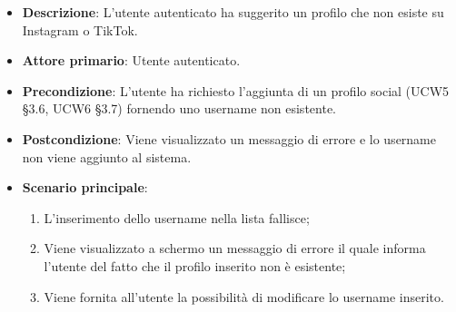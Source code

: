 \begin{itemize}
	\item \textbf{Descrizione}: L'utente autenticato ha suggerito un profilo che non esiste su Instagram o TikTok.
    \item \textbf{Attore primario}: Utente autenticato.
    \item \textbf{Precondizione}: L’utente ha richiesto l’aggiunta di un profilo social (UCW5 §3.6, UCW6 §3.7) fornendo uno username non esistente.
    \item \textbf{Postcondizione}: Viene visualizzato un messaggio di errore e lo username non viene aggiunto al sistema.
    \item \textbf{Scenario principale}: 
    \begin{enumerate}
        \item L'inserimento dello username nella lista fallisce;
        \item Viene visualizzato a schermo un messaggio di errore il quale informa l'utente del fatto che il profilo inserito non è esistente;
        \item Viene fornita all'utente la possibilità di modificare lo username inserito.
    \end{enumerate}
\end{itemize}


